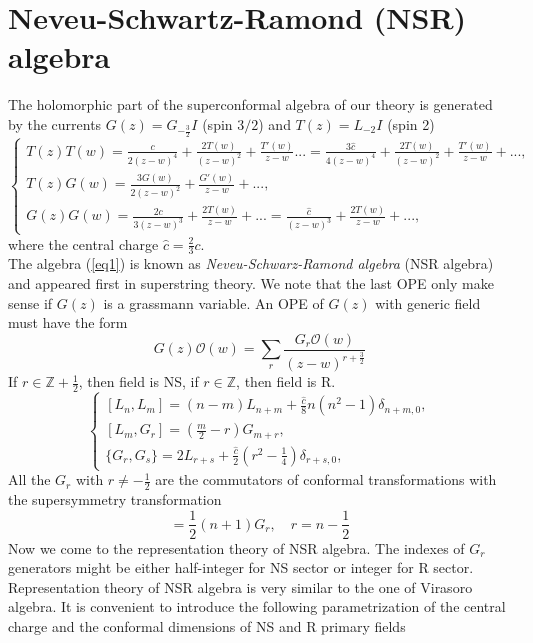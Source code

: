 \documentclass[12pt]{article}
\theoremstyle{definition}
\begin{document}
\section{Neveu-Schwartz-Ramond (NSR) algebra}
The holomorphic part of the superconformal algebra of our theory is generated by the currents $G(z)=G_{-\frac{3}{2}}I$ (spin $3/2$) and $T(z)=L_{-2}I$ (spin 2)
\begin{equation}\label{eq1}
\begin{cases}
    T(z)T(w)=\frac{c}{2(z-w)^4}+\frac{2T(w)}{(z-w)^2}+\frac{T'(w)}{z-w}...=\frac{3\hat{c}}{4(z-w)^4}+\frac{2T(w)}{(z-w)^2}+\frac{T'(w)}{z-w}+...,\\
    T(z)G(w)=\frac{3G(w)}{2(z-w)^2}+\frac{G'(w)}{z-w}+...,\\
    G(z)G(w)=\frac{2c}{3(z-w)^3}+\frac{2T(w)}{z-w}+...=\frac{\hat{c}}{(z-w)^3}+\frac{2T(w)}{z-w}+...,
\end{cases}
\end{equation}
where the central charge $\hat{c}=\frac{2}{3}c$.\\
The algebra (\ref{eq1}) is known as \textit{Neveu-Schwarz-Ramond algebra} (NSR algebra) and appeared first in superstring theory. We note that the last OPE only make sense if $G(z)$ is a grassmann variable. An OPE of $G(z)$ with generic field must have the form
\begin{equation}
    G(z)\mathcal{O}(w)=\sum\limits_r\frac{G_r\mathcal{O}(w)}{(z-w)^{r+\frac{3}{2}}}
\end{equation}
If $r\in\mathbb{Z}+\frac{1}{2}$, then field is NS, if $r\in\mathbb{Z}$, then field is R.
\begin{equation}
\begin{cases}
    [L_n,L_m]=(n-m)L_{n+m}+\frac{\hat{c}}{8}n(n^2-1)\delta_{n+m,0},\\
    [L_m,G_r]=\left(\frac{m}{2}-r\right)G_{m+r},\\
    \{G_r,G_s\}=2L_{r+s}+\frac{\hat{c}}{2}\left(r^2-\frac{1}{4}\right)\delta_{r+s,0},
\end{cases}
\end{equation}
All the $G_r$ with $r\neq-\frac{1}{2}$ are the commutators of conformal transformations with the supersymmetry transformation 
\begin{equation}
    [L_n,G_{-\frac{1}{2}}]=\frac{1}{2}(n+1)G_r,\quad r=n-\frac{1}{2}
\end{equation}
Now we come to the representation theory of NSR algebra. The indexes of $G_r$ generators might be either half-integer for NS sector or integer for R sector. Representation theory of NSR algebra is very similar to the one of Virasoro algebra. It is convenient to introduce the following parametrization of the central charge and the conformal dimensions of NS and R primary fields
\end{document}

